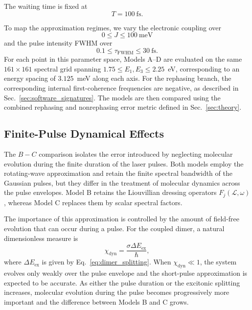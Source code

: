 The waiting time is fixed at
%
\begin{equation}
T=100~\mathrm{fs}.
\end{equation}

To map the approximation regimes, we vary the electronic coupling over
%
\begin{equation}
0\le J\le100~\mathrm{meV}
\end{equation}
%
and the pulse intensity FWHM over
%
\begin{equation}
0.1\le\tau_{\mathrm{FWHM}}\le30~\mathrm{fs}.
\end{equation}
%
For each point in this parameter space, Models A--D are
evaluated on the same $161\times161$ spectral grid spanning
$1.75\leq E_1,E_3\leq2.25$~eV, corresponding to an energy
spacing of $3.125$~meV along each axis. For the rephasing
branch, the corresponding internal first-coherence frequencies
are negative, as described in Sec.~\ref{sec:software_signatures}. The models are then
compared using the combined rephasing and nonrephasing error
metric defined in Sec.~\ref{sec:theory}.


\subsection{Finite-Pulse Dynamical Effects}
\label{subsec:pulse_dynamics}

The $B-C$ comparison isolates the error introduced by neglecting
molecular evolution during the finite duration of the laser pulses.
Both models employ the rotating-wave approximation and retain the
finite spectral bandwidth of the Gaussian pulses, but they differ in
the treatment of molecular dynamics across the pulse envelopes.
Model B retains the Liouvillian dressing operators
$F_j(\mathcal{L},\omega)$, whereas Model C replaces them by scalar
spectral factors.

The importance of this approximation is controlled by the amount of
field-free evolution that can occur during a pulse.
For the coupled dimer, a natural dimensionless measure is
%
\begin{equation}
\chi_{\mathrm{dyn}}
=
\frac{\sigma\Delta E_{\mathrm{ex}}}{\hbar},
\label{eq:dimer_chi_dyn}
\end{equation}
%
where $\Delta E_{\mathrm{ex}}$ is given by
Eq.~\eqref{eq:dimer_splitting}.
When $\chi_{\mathrm{dyn}}\ll1$, the system evolves only weakly over the
pulse envelope and the short-pulse approximation is expected to be
accurate.
As either the pulse duration or the excitonic splitting increases,
molecular evolution during the pulse becomes progressively more
important and the difference between Models B and C grows.

